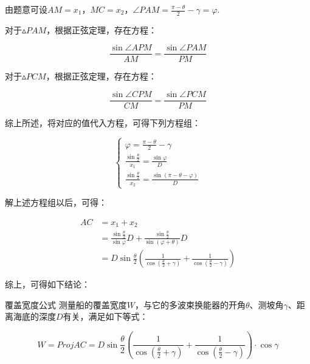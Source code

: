 由题意可设$AM=x_1$，$MC=x_2$，$\angle PAM = \frac{\pi - \theta}{2} - \gamma = \varphi $.

对于$\vartriangle PAM$，根据正弦定理，存在方程：

\begin{equation*}
    \frac{\sin\angle APM}{AM} = \frac{\sin\angle PAM}{PM}
\end{equation*}

对于$\vartriangle PCM$，根据正弦定理，存在方程：

\begin{equation*}
    \frac{\sin\angle CPM}{CM} = \frac{\sin\angle PCM}{PM}
\end{equation*}

综上所述，将对应的值代入方程，可得下列方程组：

\begin{equation}
    \begin{cases}
        \varphi = \frac{\pi - \theta}{2} - \gamma                 \\
        \frac{\sin \frac{\theta}{2}}{x_1} = \frac{\sin\varphi}{D} \\
        \frac{\sin \frac{\theta}{2}}{x_2} = \frac{\sin(\pi-\theta-\varphi)}{D}
    \end{cases}
\end{equation}

解上述方程组以后，可得：

\begin{equation}
    \begin{aligned}
        AC & = x_1 + x_2                                                                                                           \\
           & = \frac{\sin\frac{\theta}{2}}{\sin\varphi}D + \frac{\sin\frac{\theta}{2}}{\sin(\varphi + \theta)}D                    \\
           & = D\sin\frac{\theta}{2}\left(\frac{1}{\cos(\frac{\theta}{2}+\gamma)} + \frac{1}{\cos(\frac{\theta}{2}-\gamma)}\right)
    \end{aligned}
\end{equation}

综上，可得如下结论：

\begin{mcmTheorem}{覆盖宽度公式}
    测量船的覆盖宽度$W$，与它的多波束换能器的开角$\theta$、测坡角$\gamma$、距离海底的深度$D$有关，满足如下等式：

    \begin{equation}
        W =
        Proj AC =
        D\sin\frac{\theta}{2}\left(\frac{1}{\cos(\frac{\theta}{2}+\gamma)} + \frac{1}{\cos(\frac{\theta}{2}-\gamma)}\right) \cdot \cos \gamma
    \end{equation}
\end{mcmTheorem}

